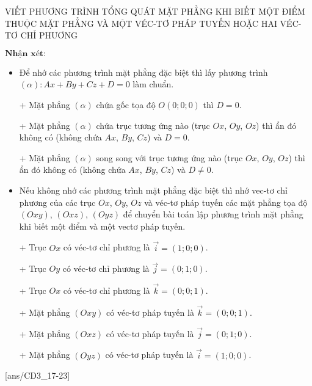 \begin{dang}{VIẾT PHƯƠNG TRÌNH TỔNG QUÁT MẶT PHẲNG KHI BIẾT MỘT ĐIỂM THUỘC MẶT PHẲNG VÀ MỘT VÉC-TƠ PHÁP TUYẾN HOẶC HAI VÉC-TƠ CHỈ PHƯƠNG}
\begin{enumerate}[a.]
	\end{enumerate}
	$\textbf{Nhận xét:}$
	\begin{itemize}
		\item Để nhớ các phương trình mặt phẳng đặc biệt thì lấy phương trình $\left(\alpha\right) \colon Ax+By+Cz+D=0$  làm chuẩn.
		\item[+] Mặt phẳng $\left(\alpha\right)$ chứa gốc tọa độ $O\left(0;0;0\right)$ thì $D=0$.
		\item[+] Mặt phẳng $\left(\alpha\right)$ chứa trục tương ứng nào (trục $Ox$, $Oy$, $Oz$) thì ẩn đó không có (không chứa $Ax$, $By$, $Cz$) và $D=0$.
		\item[+] Mặt phẳng $\left(\alpha\right)$ song song với trục tương ứng nào (trục $Ox$, $Oy$, $Oz$) thì ẩn đó không có (không chứa $Ax$, $By$, $Cz$) và $D \neq 0$.
		\item Nếu không nhớ các phương trình mặt phẳng đặc biệt thì nhớ vec-tơ chỉ phương của các trục $Ox$, $Oy$, $Oz$ và véc-tơ pháp tuyến các mặt phẳng tọa độ $\left(Oxy\right)$, $\left(Oxz\right)$, $\left(Oyz\right)$ để chuyển bài toán lập phương trình mặt phẳng khi biết một điểm và một vectơ pháp tuyến.
		\item[+] Trục $Ox$ có véc-tơ chỉ phương là $\overrightarrow{i} = \left(1;0;0\right)$.
		\item[+] Trục $Oy$ có véc-tơ chỉ phương là $\overrightarrow{j} = \left(0;1;0\right)$.
		\item[+] Trục $Ox$ có véc-tơ chỉ phương là $\overrightarrow{k} = \left(0;0;1\right)$.
		\item[+] Mặt phẳng $\left(Oxy\right)$ có véc-tơ pháp tuyến là $\overrightarrow{k} = \left(0;0;1\right)$.
		\item[+] Mặt phẳng $\left(Oxz\right)$ có véc-tơ pháp tuyến là $\overrightarrow{j} = \left(0;1;0\right)$.
		\item[+] Mặt phẳng $\left(Oyz\right)$ có véc-tơ pháp tuyến là $\overrightarrow{i} = \left(1;0;0\right)$.
	\end{itemize}
\end{dang}

[ans/CD3_17-23]
\TN

